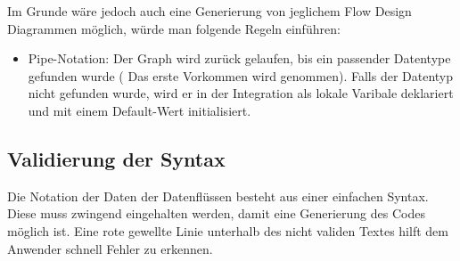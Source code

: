 \documentclass[11pt]{article}
\begin{document}
Im Grunde wäre jedoch auch eine Generierung von jeglichem Flow Design Diagrammen
möglich, würde man folgende Regeln einführen:
\begin{itemize}
\item Pipe-Notation: Der Graph wird zurück gelaufen, bis ein passender Datentype
gefunden wurde ( Das erste Vorkommen wird genommen). Falls der Datentyp nicht
gefunden wurde, wird er in der Integration als lokale Varibale deklariert und mit einem
Default-Wert initialisiert.
\end{itemize}

\subsection{Validierung der Syntax}
\label{sec:orgheadline27}
Die Notation der Daten der Datenflüssen besteht aus einer einfachen Syntax. Diese muss zwingend eingehalten
 werden, damit eine Generierung des Codes möglich ist.
 Eine rote gewellte Linie unterhalb des nicht validen Textes hilft dem Anwender
 schnell Fehler zu erkennen.
\end{document}
